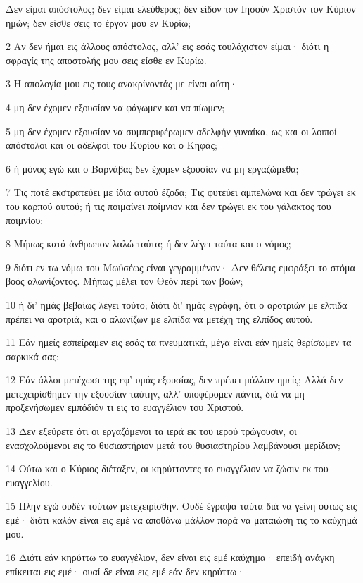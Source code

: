 \par Δεν είμαι απόστολος; δεν είμαι ελεύθερος; δεν είδον τον Ιησούν Χριστόν τον Κύριον ημών; δεν είσθε σεις το έργον μου εν Κυρίω;
\par 2 Αν δεν ήμαι εις άλλους απόστολος, αλλ' εις εσάς τουλάχιστον είμαι· διότι η σφραγίς της αποστολής μου σεις είσθε εν Κυρίω.
\par 3 Η απολογία μου εις τους ανακρίνοντάς με είναι αύτη·
\par 4 μη δεν έχομεν εξουσίαν να φάγωμεν και να πίωμεν;
\par 5 μη δεν έχομεν εξουσίαν να συμπεριφέρωμεν αδελφήν γυναίκα, ως και οι λοιποί απόστολοι και οι αδελφοί του Κυρίου και ο Κηφάς;
\par 6 ή μόνος εγώ και ο Βαρνάβας δεν έχομεν εξουσίαν να μη εργαζώμεθα;
\par 7 Τις ποτέ εκστρατεύει με ίδια αυτού έξοδα; Τις φυτεύει αμπελώνα και δεν τρώγει εκ του καρπού αυτού; ή τις ποιμαίνει ποίμνιον και δεν τρώγει εκ του γάλακτος του ποιμνίου;
\par 8 Μήπως κατά άνθρωπον λαλώ ταύτα; ή δεν λέγει ταύτα και ο νόμος;
\par 9 διότι εν τω νόμω του Μωϋσέως είναι γεγραμμένον· Δεν θέλεις εμφράξει το στόμα βοός αλωνίζοντος. Μήπως μέλει τον Θεόν περί των βοών;
\par 10 ή δι' ημάς βεβαίως λέγει τούτο; διότι δι' ημάς εγράφη, ότι ο αροτριών με ελπίδα πρέπει να αροτριά, και ο αλωνίζων με ελπίδα να μετέχη της ελπίδος αυτού.
\par 11 Εάν ημείς εσπείραμεν εις εσάς τα πνευματικά, μέγα είναι εάν ημείς θερίσωμεν τα σαρκικά σας;
\par 12 Εάν άλλοι μετέχωσι της εφ' υμάς εξουσίας, δεν πρέπει μάλλον ημείς; Αλλά δεν μετεχειρίσθημεν την εξουσίαν ταύτην, αλλ' υποφέρομεν πάντα, διά να μη προξενήσωμεν εμπόδιόν τι εις το ευαγγέλιον του Χριστού.
\par 13 Δεν εξεύρετε ότι οι εργαζόμενοι τα ιερά εκ του ιερού τρώγουσιν, οι ενασχολούμενοι εις το θυσιαστήριον μετά του θυσιαστηρίου λαμβάνουσι μερίδιον;
\par 14 Ούτω και ο Κύριος διέταξεν, οι κηρύττοντες το ευαγγέλιον να ζώσιν εκ του ευαγγελίου.
\par 15 Πλην εγώ ουδέν τούτων μετεχειρίσθην. Ουδέ έγραψα ταύτα διά να γείνη ούτως εις εμέ· διότι καλόν είναι εις εμέ να αποθάνω μάλλον παρά να ματαιώση τις το καύχημά μου.
\par 16 Διότι εάν κηρύττω το ευαγγέλιον, δεν είναι εις εμέ καύχημα· επειδή ανάγκη επίκειται εις εμέ· ουαί δε είναι εις εμέ εάν δεν κηρύττω·

